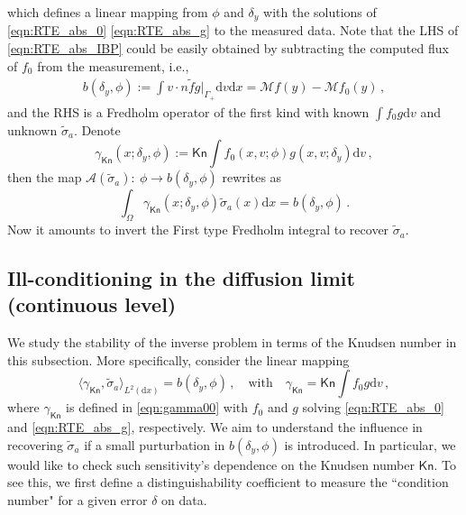 \documentclass[english,reqno]{amsart}
\theoremstyle{plain}
\theoremstyle{definition} %
\newcommand{\rd}{\mathrm{d}}
\newcommand{\Kn}{\mathsf{Kn}}
\begin{document}
which defines a linear mapping from $\phi$ and $\delta_y$ with the solutions of \eqref{eqn:RTE_abs_0} \eqref{eqn:RTE_abs_g} to the measured data. 
Note that the LHS of \eqref{eqn:RTE_abs_IBP} could be easily obtained by subtracting the computed flux of $f_0$ from the measurement, i.e.,
\begin{eqnarray*}
b(\delta_y, \phi) := \int  v\cdot n \tilde{f} g |_{\Gamma_+}\rd{v} \rd{x}   =\mathcal{M}f(y)-\mathcal{M}f_0(y)  \,,
\end{eqnarray*}
and the RHS is a Fredholm operator of the first kind with known $\int f_0 g \rd{v}$ and unknown $\tilde{\sigma}_a$. Denote 
\begin{equation} \label{eqn:gamma00}
\gamma_\Kn(x;\delta_y,\phi):= \Kn \int f_0(x,v;\phi) g(x,v; \delta_y)\rd{v}\,,
\end{equation}
then the map $\mathcal{A}(\tilde{\sigma}_a):~ \phi \rightarrow  b(\delta_y, \phi)$ rewrites as 
\begin{equation}\label{eqn:LS_abs}
 \int_{\Omega} \gamma_\Kn(x;\delta_y,\phi)\tilde{\sigma}_a(x)\rd{x}=b(\delta_y,\phi)\,.
\end{equation}
Now it amounts to invert the First type Fredholm integral to recover $\tilde{\sigma}_a$.

\subsection{Ill-conditioning in the diffusion limit (continuous level)}
We study the stability of the inverse problem in terms of the Knudsen number in this subsection. More specifically, consider the linear mapping 
\begin{equation}\label{eqn:map_abs}
\langle \gamma_\Kn, \tilde{\sigma}_a \rangle_{L^2(\rd{x})}= b(\delta_y, \phi )\,,\quad\text{with}\quad\gamma_\Kn = \Kn \int f_0g\rd{v} \,, %
\end{equation}
where $\gamma_\Kn $ is defined in \eqref{eqn:gamma00} with $f_0$ and $g$ solving \eqref{eqn:RTE_abs_0} and \eqref{eqn:RTE_abs_g}, respectively. We aim to understand the influence in recovering $ \tilde{\sigma}_a$ if a small purturbation in $b(\delta_y, \phi)$ is introduced. In particular, we would like to check such sensitivity's dependence on the Knudsen number $\Kn$. To see this, we first define a distinguishability coefficient to measure the ``condition number" for a given error $\delta$ on data.
\end{document}
